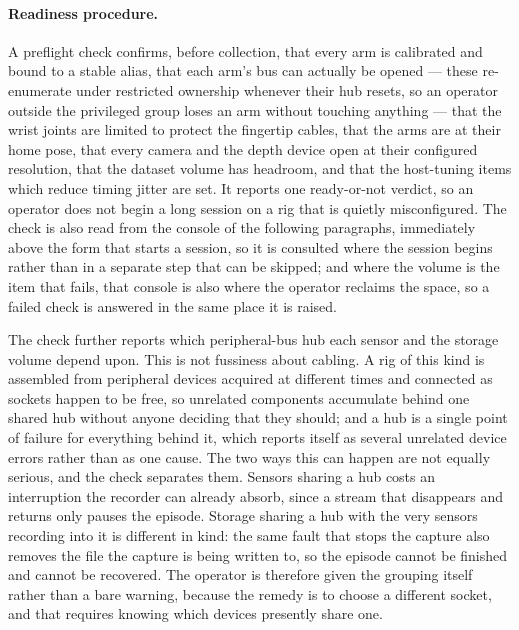\paragraph{Readiness procedure.} A preflight check confirms, before
collection, that every arm is calibrated and bound to a stable alias, that
each arm's bus can actually be opened --- these re-enumerate under restricted
ownership whenever their hub resets, so an operator outside the privileged
group loses an arm without touching anything --- that the wrist joints are
limited to protect the fingertip cables, that the arms are at their home pose,
that every camera and the depth device open at their configured resolution,
that the dataset volume has headroom, and that the host-tuning items which
reduce timing jitter are set. It reports one
ready-or-not verdict, so an operator does not begin a long session on a rig
that is quietly misconfigured. The check is also read from the console of the
following paragraphs, immediately above the form that starts a session, so it
is consulted where the session begins rather than in a separate step that can
be skipped; and where the volume is the item that fails, that console is also
where the operator reclaims the space, so a failed check is answered in the
same place it is raised.

The check further reports which peripheral-bus hub each sensor and the
storage volume depend upon. This is not fussiness about cabling. A rig of
this kind is assembled from peripheral devices acquired at different times
and connected as sockets happen to be free, so unrelated components
accumulate behind one shared hub without anyone deciding that they should;
and a hub is a single point of failure for everything behind it, which
reports itself as several unrelated device errors rather than as one cause.
The two ways this can happen are not equally serious, and the check
separates them. Sensors sharing a hub costs an interruption the recorder can
already absorb, since a stream that disappears and returns only pauses the
episode. Storage sharing a hub with the very sensors recording into it is
different in kind: the same fault that stops the capture also removes the
file the capture is being written to, so the episode cannot be finished and
cannot be recovered. The operator is therefore given the grouping itself
rather than a bare warning, because the remedy is to choose a different
socket, and that requires knowing which devices presently share one.

